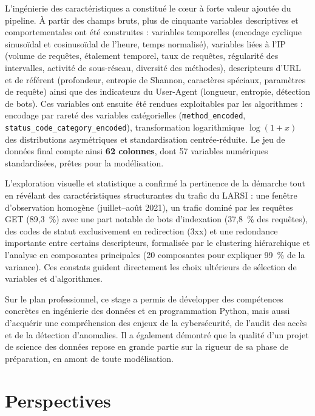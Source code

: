 \documentclass[a4paper,12pt]{article}
\begin{document}
L'ingénierie des caractéristiques a constitué le cœur à forte valeur ajoutée du pipeline. À partir des champs bruts, plus de cinquante variables descriptives et comportementales ont été construites : variables temporelles (encodage cyclique sinusoïdal et cosinusoïdal de l'heure, temps normalisé), variables liées à l'IP (volume de requêtes, étalement temporel, taux de requêtes, régularité des intervalles, activité de sous-réseau, diversité des méthodes), descripteurs d'URL et de référent (profondeur, entropie de Shannon, caractères spéciaux, paramètres de requête) ainsi que des indicateurs du User-Agent (longueur, entropie, détection de bots). Ces variables ont ensuite été rendues exploitables par les algorithmes : encodage par rareté des variables catégorielles (\texttt{method\_encoded}, \texttt{status\_code\_category\_encoded}), transformation logarithmique $\log(1+x)$ des distributions asymétriques et standardisation centrée-réduite. Le jeu de données final compte ainsi \textbf{62 colonnes}, dont 57 variables numériques standardisées, prêtes pour la modélisation.

L'exploration visuelle et statistique a confirmé la pertinence de la démarche tout en révélant des caractéristiques structurantes du trafic du LARSI : une fenêtre d'observation homogène (juillet--août 2021), un trafic dominé par les requêtes GET (89,3~\%) avec une part notable de bots d'indexation (37,8~\% des requêtes), des codes de statut exclusivement en redirection (3xx) et une redondance importante entre certains descripteurs, formalisée par le clustering hiérarchique et l'analyse en composantes principales (20 composantes pour expliquer 99~\% de la variance). Ces constats guident directement les choix ultérieurs de sélection de variables et d'algorithmes.

Sur le plan professionnel, ce stage a permis de développer des compétences concrètes en ingénierie des données et en programmation Python, mais aussi d'acquérir une compréhension des enjeux de la cybersécurité, de l'audit des accès et de la détection d'anomalies. Il a également démontré que la qualité d'un projet de science des données repose en grande partie sur la rigueur de sa phase de préparation, en amont de toute modélisation.

\section*{Perspectives}
\end{document}
